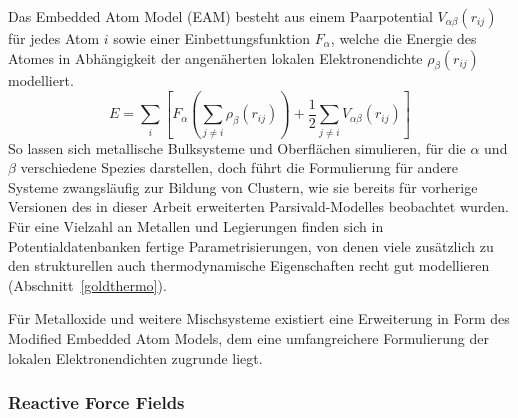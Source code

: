 Das Embedded Atom Model (EAM) besteht aus einem Paarpotential $V_{\alpha\beta}(r_{ij})$ für jedes Atom $i$ sowie einer Einbettungsfunktion $F_\alpha$, welche die Energie des Atomes in Abhängigkeit der angenäherten lokalen Elektronendichte $\rho_\beta(r_{ij})$ modelliert\cite{daw_embedded-atom_1984}.
\begin{equation}
  E = \sum_i\left[F_\alpha\left(\sum_{j\neq i}{\rho_\beta\left(r_{ij}\right)}\right) + \frac{1}{2}\sum_{j\neq i}{V_{\alpha\beta}\left(r_{ij}\right)}\right]
\end{equation}
So lassen sich metallische Bulksysteme und Oberflächen simulieren, für die $\alpha$ und $\beta$ verschiedene Spezies darstellen, doch führt die Formulierung für andere Systeme zwangsläufig zur Bildung von Clustern, wie sie bereits für vorherige Versionen des in dieser Arbeit erweiterten Parsivald-Modelles beobachtet wurden\cite{lorenz_entwicklung_2012}.
Für eine Vielzahl an Metallen und Legierungen finden sich in Potentialdatenbanken fertige Parametrisierungen\cite{becker_interatomic_2014}, von denen viele zusätzlich zu den strukturellen auch thermodynamische Eigenschaften recht gut modellieren (Abschnitt~\ref{goldthermo}).


Für Metalloxide und weitere Mischsysteme existiert eine Erweiterung in Form des Modified Embedded Atom Models\cite{baskes_modified_1992}, dem eine umfangreichere Formulierung der lokalen Elektronendichten zugrunde liegt.



\subsubsection{Reactive Force Fields}


